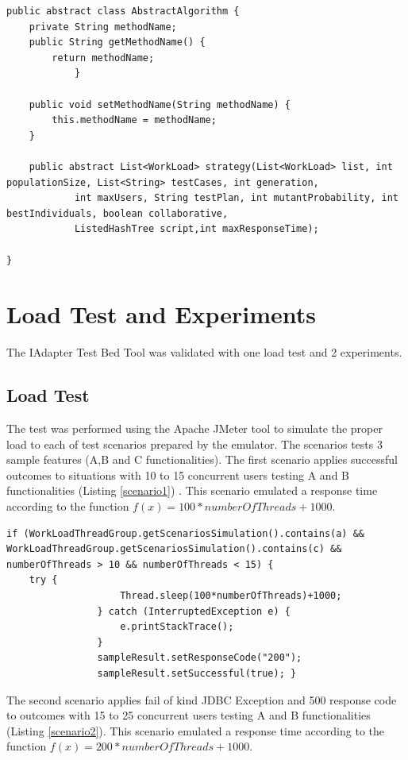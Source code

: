 \documentclass[review]{elsarticle}
\begin{document}
\begin{lstlisting}[style=outline,caption={Emulated Scenario 1},label=scenario1]
public abstract class AbstractAlgorithm {
	private String methodName;
	public String getMethodName() {
		return methodName;
			}

	public void setMethodName(String methodName) {
		this.methodName = methodName;
	}

	public abstract List<WorkLoad> strategy(List<WorkLoad> list, int populationSize, List<String> testCases, int generation,
			int maxUsers, String testPlan, int mutantProbability, int bestIndividuals, boolean collaborative,
			ListedHashTree script,int maxResponseTime);
			
}
\end{lstlisting}




\section{Load Test and Experiments}

The IAdapter Test Bed Tool was validated with one  load test and 2 experiments. 

\subsection{Load Test}

The test was performed using the Apache JMeter tool to simulate the proper load to each of test scenarios prepared by the emulator. The scenarios tests 3 sample features (A,B and C functionalities). The first scenario applies successful outcomes to situations with 10 to 15 concurrent users testing A and B functionalities (Listing \ref{scenario1}) . This scenario emulated a response time according to the function $f(x)=100*numberOfThreads+1000$. 


\begin{lstlisting}[style=outline,caption={Emulated Scenario 1},label=scenario1]
if (WorkLoadThreadGroup.getScenariosSimulation().contains(a) && WorkLoadThreadGroup.getScenariosSimulation().contains(c) && numberOfThreads > 10 && numberOfThreads < 15) {
    try {
					Thread.sleep(100*numberOfThreads)+1000;
				} catch (InterruptedException e) {
					e.printStackTrace();	
				}
				sampleResult.setResponseCode("200");
				sampleResult.setSuccessful(true); }
\end{lstlisting}

The second scenario applies fail of kind JDBC Exception and 500 response code to  outcomes  with 15 to 25 concurrent users testing A and B functionalities (Listing \ref{scenario2}).  This scenario emulated a response time according to the function $f(x)=200*numberOfThreads+1000$. 
\end{document}
